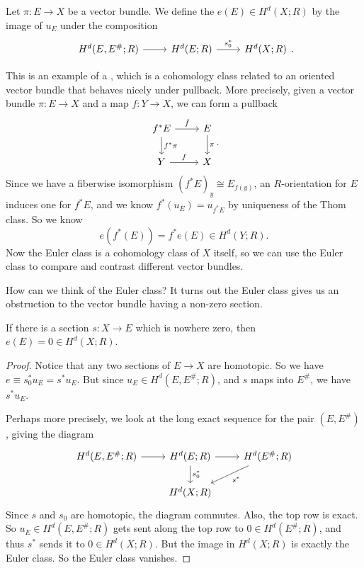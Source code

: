 \documentclass[a4paper]{article}
\theoremstyle{definition}
\begin{document}
\begin{defi}
  Let $\pi: E \to X$ be a vector bundle. We define the  $e(E) \in H^d(X; R)$ by the image of $u_E$ under the composition
  \[
    \begin{tikzcd}
      H^d(E, E^\#; R) \ar[r] & H^d(E; R) \ar[r, "s_0^*"] & H^d(X; R)
    \end{tikzcd}.
  \]
\end{defi}
This is an example of a , which is a cohomology class related to an oriented vector bundle that behaves nicely under pullback. More precisely, given a vector bundle $\pi: E \to X$ and a map $f: Y \to X$, we can form a pullback
\[
  \begin{tikzcd}
    f^*E \ar[r, "\hat{f}"] \ar[d, "f^*\pi"] & E \ar[d, "\pi"]\\
    Y \ar[r, "f"] & X
  \end{tikzcd}.
\]
Since we have a fiberwise isomorphism $(f^*E)_y \cong E_{f(y)}$, an $R$-orientation for $E$ induces one for $f^* E$, and we know $f^*(u_E) = u_{f^* E}$ by uniqueness of the Thom class. So we know
\[
  e(f^*(E)) = f^* e(E) \in H^d(Y; R).
\]
Now the Euler class is a cohomology class of $X$ itself, so we can use the Euler class to compare and contrast different vector bundles.

How can we think of the Euler class? It turns out the Euler class gives us an obstruction to the vector bundle having a non-zero section.
\begin{thm}
  If there is a section $s: X \to E$ which is nowhere zero, then $e(E) = 0 \in H^d(X; R)$.
\end{thm}

\begin{proof}
  Notice that any two sections of $E \to X$ are homotopic. So we have $e \equiv s_0^* u_E = s^* u_E$. But since $u_E \in H^d(E, E^\#; R)$, and $s$ maps into $E^\#$, we have $s^* u_E$.

  Perhaps more precisely, we look at the long exact sequence for the pair $(E, E^\#)$, giving the diagram
  \[
    \begin{tikzcd}
      H^d(E, E^\#; R) \ar[r] & H^d(E; R) \ar[r] \ar[d, "s_0^*"] & H^d(E^\#; R) \ar[dl, "s^*"]\\
      & H^d(X; R)
    \end{tikzcd}
  \]
  Since $s$ and $s_0$ are homotopic, the diagram commutes. Also, the top row is exact. So $u_E \in H^d(E, E^\#; R)$ gets sent along the top row to $0 \in H^d(E^\#; R)$, and thus $s^*$ sends it to $0 \in H^d(X; R)$. But the image in $H^d(X; R)$ is exactly the Euler class. So the Euler class vanishes.
\end{proof}
\end{document}
